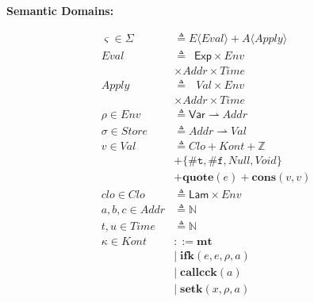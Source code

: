\documentclass[12pt,draft]{article}
\newcommand{\truesyn}{\texttt{\#t}}
\newcommand{\falsesyn}{\texttt{\#f}}
\begin{document}
\begin{multicols*}{2}
\vfill\null
\columnbreak


\begin{center}
\textbf{Semantic Domains:}
\end{center}
\vspace{-18mm}
\begin{center}
\begin{align*}
\varsigma \in \Sigma &\triangleq E\langle\textit{Eval}\rangle 
								+ A\langle\textit{Apply}\rangle \\
\textit{Eval} &\triangleq \:\;\textsf{Exp} \times \textit{Env} \\
						& \times \textit{Addr} \times \textit{Time} \\
\textit{Apply} &\triangleq \:\;\,\textit{Val} \times \textit{Env} \\
						& \times \textit{Addr} \times \textit{Time} \\
\rho \in \textit{Env} &\triangleq \textsf{Var} \rightharpoonup 
												\textit{Addr} \\
\sigma \in \textit{Store} &\triangleq \textit{Addr} \rightharpoonup
													\textit{Val} \\
v \in \textit{Val} &\triangleq \textit{Clo} + \textit{Kont} + \mathbb{Z} \\
				&+ \{ \truesyn,\falsesyn, \textit{Null} , \textit{Void} \} \\
				&+ \textbf{quote}(e) + \textbf{cons}(v, v) \\
clo \in \textit{Clo} &\triangleq \textsf{Lam} \times \textit{Env} \\
a,b,c \in \textit{Addr} &\triangleq \mathbb{N} \\
t,u \in \textit{Time} &\triangleq \mathbb{N} \\
\kappa \in \textit{Kont} &::= \textbf{mt} \\
        &|\; \textbf{ifk}(e, e, \rho, a) \\
        &|\; \textbf{callcck}(a) \\
        &|\; \textbf{setk}(x, \rho, a) \\

\end{align*}
\end{center}
\end{multicols*}
\end{document}
